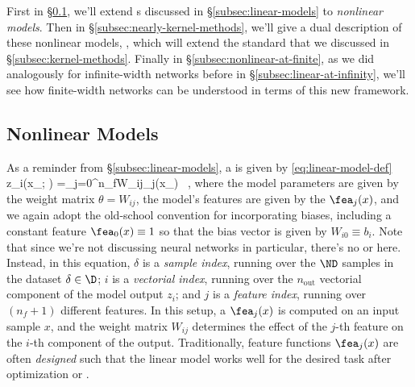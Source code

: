 First in \S\ref{subsec:nonlinear-models}, we'll extend s discussed in \S\ref{subsec:linear-models} to \emph{nonlinear models}.
Then in \S\ref{subsec:nearly-kernel-methods}, we'll give a dual description of these nonlinear models, , which will extend the standard  that we discussed in \S\ref{subsec:kernel-methods}.
Finally in \S\ref{subsec:nonlinear-at-finite}, as we did analogously for infinite-width networks before in \S\ref{subsec:linear-at-infinity}, we'll see how finite-width networks can be understood in terms of this new
framework. %






\subsection{Nonlinear Models}\label{subsec:nonlinear-models}
As a reminder from \S\ref{subsec:linear-models}, a   is given by \eqref{eq:linear-model-def}
\be\label{eq:linear-model-def-reprint}
z_i(x_{\delta}; \theta) =\sum_{j=0}^{n_f}W_{ij}\fea_j(x_{\delta}) \, ,
\ee
where the model parameters are given by the weight matrix $\theta=W_{ij}$, the model's features are given by the  $\fea_{j}(x)$, and we again adopt the old-school convention for incorporating biases, including a constant feature $\fea_{0}(x)\equiv 1$ so that the bias vector is given by $W_{i0}\equiv b_{i}$.
Note that since we're not discussing neural networks in particular, there's no  or  here. Instead, in this equation,
$\delta$ is a \emph{sample index}, running over the $\ND$ samples in the dataset $\delta \in \D$; $i$ is a \emph{vectorial index}, running over the $n_{\text{out}}$ vectorial component of the model output $z_i$; and $j$ is a \emph{feature index}, running over $(n_f+1)$ different features. In this setup, a  $\fea_{j}(x)$ is computed on an input sample $x$, and the weight matrix $W_{ij}$ determines the effect of the $j$-th feature on the $i$-th component of the output.
Traditionally, feature functions  $\fea_{j}(x)$ are often \emph{designed} such that the linear model works well for the desired task after optimization or  .






